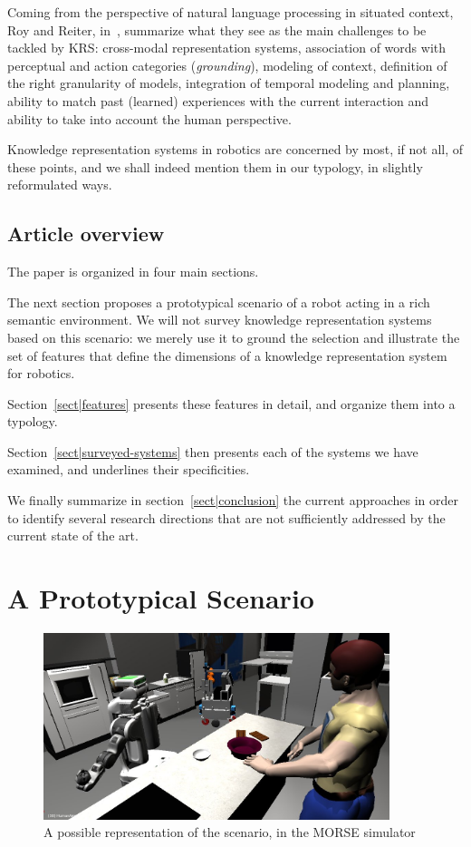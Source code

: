 \documentclass[a4paper, twocolumn]{article}
\begin{document}
Coming from the perspective of natural language processing in situated context,
Roy and Reiter, in~\cite{Roy2005}, summarize what they see as the main
challenges to be tackled by KRS: cross-modal representation systems,
association of words with perceptual and action categories (\emph{grounding}),
modeling of context, definition of the right granularity of models, integration
of temporal modeling and planning, ability to match past (learned) experiences
with the current interaction and ability to take into account the human
perspective.

Knowledge representation systems in robotics are concerned by most, if not all,
of these points, and we shall indeed mention them in our typology, in slightly
reformulated ways.

\subsection{Article overview}
\label{sect|overview}

The paper is organized in four main sections.

The next section proposes a prototypical scenario of a robot acting in a rich
semantic environment. We will not survey knowledge representation systems based
on this scenario: we merely use it to ground the selection and illustrate the
set of features that define the dimensions of a knowledge representation system
for robotics.

Section~\ref{sect|features} presents these features in detail, and organize
them into a typology.

Section~\ref{sect|surveyed-systems} then presents each of the systems we have
examined, and underlines their specificities.

We finally summarize in section~\ref{sect|conclusion} the current approaches in
order to identify several research directions that are not sufficiently
addressed by the current state of the art.

\section{A Prototypical Scenario}
\label{sect|scenario}

\begin{figure}
	\centering
	\includegraphics[width=0.9\textwidth]{figs/brownie_scenario.jpg}
	\caption{A possible representation of the scenario, in the MORSE simulator}
	\label{fig|scenario}
\end{figure}
\end{document}
